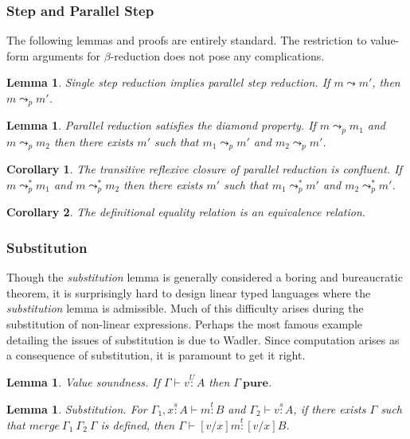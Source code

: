 \documentclass{article}
\newtheorem{corollary}{Corollary}[theorem]
\newtheorem{lemma}[theorem]{Lemma}
\newcommand{\pure}{\textbf{pure}}
\newcommand{\utype}{\overset{U}{:}}
\newcommand{\stype}[1]{\overset{#1}{:}}
\newcommand{\step}{\leadsto}
\newcommand{\pstep}{\leadsto_p}
\begin{document}
  \subsubsection{Step and Parallel Step}

  The following lemmas and proofs are entirely standard. The restriction to value-form arguments for $\beta$-reduction does not pose any complications.

  \begin{lemma}
    Single step reduction implies parallel step reduction. If $m \step m'$, then $m \pstep m'$.
  \end{lemma}

  \begin{lemma}
    Parallel reduction satisfies the diamond property. If $m \pstep m_1$ and $m \pstep m_2$ then there exists $m'$ such that $m_1 \pstep m'$ and $m_2 \pstep m'$.
  \end{lemma}

  \begin{corollary}
    The transitive reflexive closure of parallel reduction is confluent. If $m \pstep^* m_1$ and $m \pstep^* m_2$ then there exists $m'$ such that $m_1 \pstep^* m'$ and $m_2 \pstep^* m'$.
  \end{corollary}

  \begin{corollary}
    The definitional equality relation is an equivalence relation.
  \end{corollary}

  \subsubsection{Substitution}
  Though the \textit{substitution} lemma is generally considered a boring and bureaucratic theorem, it is surprisingly hard to design linear typed languages where the \textit{substitution} lemma is admissible. Much of this difficulty arises during the substitution of non-linear expressions. Perhaps the most famous example detailing the issues of substitution is due to Wadler\cite{substitute}. Since computation arises as a consequence of substitution, it is paramount to get it right.

  \begin{lemma}
    Value soundness. If $\Gamma \vdash v \utype A$ then $\Gamma\ \pure$.
  \end{lemma}

  \begin{lemma}
    Substitution. For $\Gamma_1, x \stype{s} A \vdash m \stype{t} B$ and $\Gamma_2 \vdash v \stype{s} A$, if there exists $\Gamma$ such that $merge\ \Gamma_1\ \Gamma_2\ \Gamma$ is defined, then $\Gamma \vdash [v/x]m \stype{t} [v/x]B$.
  \end{lemma}
\end{document}
